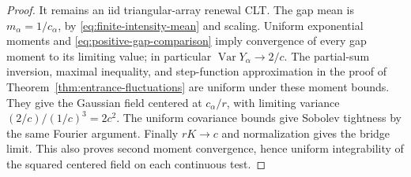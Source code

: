 \documentclass[11pt,letterpaper]{article}
\begin{document}
\begin{proof}
It remains an iid triangular-array renewal CLT. The gap mean is
$m_\alpha=1/c_\alpha$, by \eqref{eq:finite-intensity-mean} and
scaling. Uniform exponential moments and
\eqref{eq:positive-gap-comparison} imply convergence of every
gap moment to its limiting value; in particular
$\operatorname{Var}Y_\alpha\to2/c$. The partial-sum inversion,
maximal inequality, and step-function approximation in the proof
of Theorem~\ref{thm:entrance-fluctuations} are uniform under these
moment bounds. They give the Gaussian field centered at
$c_\alpha/r$, with limiting variance
$(2/c)/(1/c)^3=2c^2$. The uniform covariance bounds give Sobolev
tightness by the same Fourier argument. Finally $rK\to c$ and
normalization gives the bridge limit. This also proves second
moment convergence, hence uniform integrability of the squared
centered field on each continuous test.
\end{proof}
\end{document}
